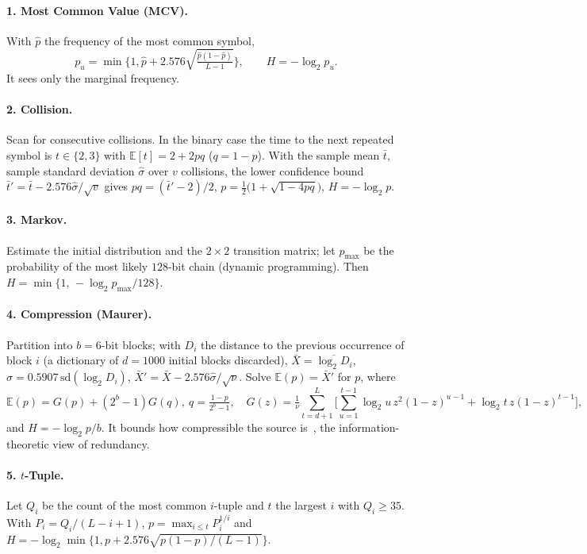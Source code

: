 \documentclass[11pt,a4paper]{article}
\theoremstyle{plain}
\theoremstyle{definition}
\begin{document}
\paragraph{1. Most Common Value (MCV).} With $\hat p$ the frequency of the most
common symbol,
\begin{equation}
p_u=\min\Big\{1,\hat p+2.576\sqrt{\tfrac{\hat p(1-\hat p)}{L-1}}\Big\},\qquad H=-\log_2p_u.
\end{equation}
It sees only the marginal frequency.

\paragraph{2. Collision.} Scan for consecutive collisions. In the binary case
the time to the next repeated symbol is $t\in\{2,3\}$ with
$\mathbb{E}[t]=2+2pq$ ($q=1-p$). With the sample mean $\bar t$, sample standard
deviation $\hat\sigma$ over $v$ collisions, the lower confidence bound
$\bar t'=\bar t-2.576\hat\sigma/\sqrt v$ gives
$pq=(\bar t'-2)/2$, $p=\tfrac12\big(1+\sqrt{1-4pq}\big)$, $H=-\log_2p$.

\paragraph{3. Markov.} Estimate the initial distribution and the $2\times2$
transition matrix; let $p_{\max}$ be the probability of the most likely
$128$-bit chain (dynamic programming). Then
$H=\min\{1,\,-\log_2p_{\max}/128\}$.

\paragraph{4. Compression (Maurer).} Partition into $b=6$-bit blocks; with
$D_i$ the distance to the previous occurrence of block $i$ (a dictionary of
$d=1000$ initial blocks discarded), $\bar X=\overline{\log_2D_i}$,
$\hat\sigma=0.5907\,\mathrm{sd}(\log_2D_i)$, $\bar X'=\bar X-2.576\hat\sigma/\sqrt{\nu}$.
Solve $\mathbb{E}(p)=\bar X'$ for $p$, where
\begin{equation}
    \mathbb{E}(p)=G(p)+(2^b-1)G(q),\ q=\tfrac{1-p}{2^b-1},\quad
    G(z)=\tfrac1\nu\!\!\sum_{t=d+1}^{L}\!\Big[\sum_{u=1}^{t-1}\!\log_2u\,z^2(1-z)^{u-1}
    +\log_2t\,z(1-z)^{t-1}\Big],
\end{equation}
and $H=-\log_2p/b$. It bounds how compressible the source is~\cite{maurer92}, the information-theoretic view of redundancy.

\paragraph{5. $t$-Tuple.} Let $Q_i$ be the count of the most common $i$-tuple and
$t$ the largest $i$ with $Q_i\ge35$. With $P_i=Q_i/(L-i+1)$,
$p=\max_{i\le t}P_i^{1/i}$ and $H=-\log_2\min\{1,p+2.576\sqrt{p(1-p)/(L-1)}\}$.
\end{document}
